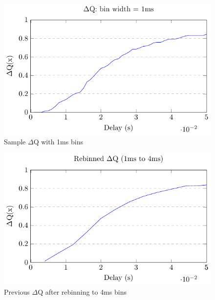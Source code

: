         
        \begin{figure}[H]
            \begin{center}
                \includegraphics[scale=1.4]{tikz/cdf.pdf}
            \end{center}
            \caption{Sample $\Delta$Q with 1ms bins}
        \end{figure}

 
        \begin{figure}[H]
            \begin{center}
                \includegraphics[scale=1.4]{tikz/rebinned_cdf.pdf}
            \end{center}
            \caption{Previous $\Delta$Q after rebinning to 4ms bins}
        \end{figure}
